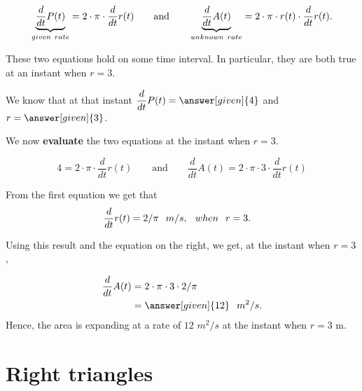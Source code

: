 \documentclass{ximera}
\begin{document}
\begin{example}
\begin{explanation}
    \[
  \underbrace{ \dfrac{d}{dt}P(t)}_{given\hspace{0.05in} rate} = 2\cdot \pi\cdot  \dfrac{d}{dt}r(t)
    \qquad\text{and}\qquad
    \underbrace{ \dfrac{d}{dt}A(t)}_{unknown \hspace{0.05in}rate} = 2\cdot \pi\cdot r(t) \cdot  \dfrac{d}{dt}r(t).
    \]
    
    These two equations hold on some time interval. In particular, they are both true at an instant when $r=3$.
    
   We know  that at that instant $ \dfrac{d}{dt}P(t) =
    \answer[given]{4}$ and $r = \answer[given]{3}$. 
    
    We now \textbf{evaluate}  the two equations at the instant when $r=3$.
    
        \[
    4 = 2\cdot \pi\cdot \dfrac{d}{dt}r(t)
    \qquad\text{and}\qquad
  \dfrac{d}{dt}A(t) = 2\cdot \pi\cdot 3 \cdot \dfrac{d}{dt}r(t) 
    \]
    
    
   From the first equation we get that
    \begin{align*}
     \frac{d}{dt}r(t)&=  2/\pi \hspace{0.1in} m/s, \hspace{0.1in} when \hspace{0.1in} r=3.    
    \end{align*} 
   
  Using this result and the equation on the right, we get, at the instant when $r=3$,
   
    \begin{align*}
    \dfrac{d}{dt}A(t) &= 2\cdot \pi\cdot 3 \cdot 2/\pi\\
      &=\answer[given]{12}\hspace{0.1in} m^2/s.
    \end{align*}
    Hence, the area is expanding at a rate of $12$ $m^2/s$ at the instant when $r=3$ m.
  \end{explanation}
\end{example}





\section{Right triangles}
\end{document}
